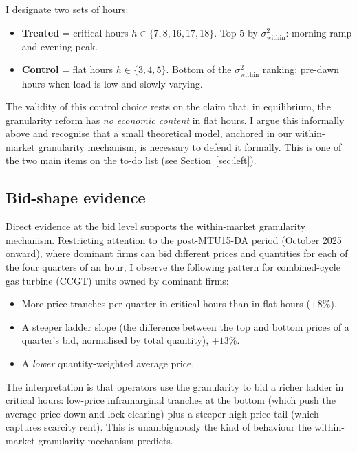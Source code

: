 \documentclass[11pt,a4paper]{article}
\begin{document}
I designate two sets of hours:

\begin{itemize}
  \item \textbf{Treated} = critical hours $h \in \{7, 8, 16, 17, 18\}$. Top-5 by $\sigma^2_{\text{within}}$: morning ramp and evening peak.
  \item \textbf{Control} = flat hours $h \in \{3, 4, 5\}$. Bottom of the $\sigma^2_{\text{within}}$ ranking: pre-dawn hours when load is low and slowly varying.
\end{itemize}

The validity of this control choice rests on the claim that, in equilibrium, the granularity reform has \emph{no economic content} in flat hours. I argue this informally above and recognise that a small theoretical model, anchored in our within-market granularity mechanism, is necessary to defend it formally. This is one of the two main items on the to-do list (see Section~\ref{sec:left}).

\subsection{Bid-shape evidence}

Direct evidence at the bid level supports the within-market granularity mechanism. Restricting attention to the post-MTU15-DA period (October 2025 onward), where dominant firms can bid different prices and quantities for each of the four quarters of an hour, I observe the following pattern for combined-cycle gas turbine (CCGT) units owned by dominant firms:

\begin{itemize}
  \item More price tranches per quarter in critical hours than in flat hours ($+8\%$).
  \item A steeper ladder slope (the difference between the top and bottom prices of a quarter's bid, normalised by total quantity), $+13\%$.
  \item A \emph{lower} quantity-weighted average price.
\end{itemize}

The interpretation is that operators use the granularity to bid a richer ladder in critical hours: low-price inframarginal tranches at the bottom (which push the average price down and lock clearing) plus a steeper high-price tail (which captures scarcity rent). This is unambiguously the kind of behaviour the within-market granularity mechanism predicts.
\end{document}
